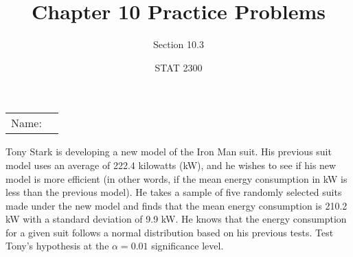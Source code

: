 \documentclass[noanswers]{exam}
\title{Chapter 10 Practice Problems}
\author{Section 10.3}
\date{STAT 2300}
\begin{document}
\noindent\begin{tabular}{@{}p{.3in}p{3in}@{}}
Name: & \hrulefill
\end{tabular}

\vspace{4mm}

\begin{questions} 

\question Tony Stark is developing a new model of the Iron Man suit. His previous suit model uses an average of 222.4 kilowatts (kW), and he wishes to see if his new model is more efficient (in other words, if the mean energy consumption in kW is less than the previous model). He takes a sample of five randomly selected suits made under the new model and finds that the mean energy consumption is 210.2 kW with a standard deviation of 9.9 kW. He knows that the energy consumption for a given suit follows a normal distribution based on his previous tests. Test Tony's hypothesis at the $\alpha=0.01$ significance level.

\vspace{3mm}

\end{questions}
\end{document}
